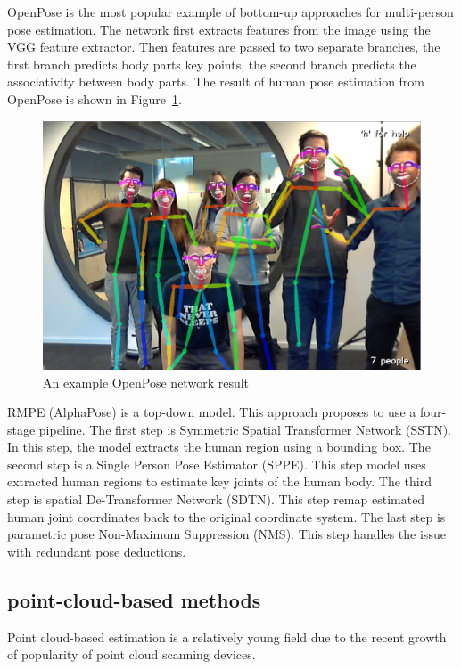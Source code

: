 OpenPose \parencite{cao_openpose_2019} is the most popular example of bottom-up approaches for multi-person pose estimation. The network first extracts features from the image using the VGG feature extractor. Then features are passed to two separate branches, the first branch predicts body parts key points, the second branch predicts the associativity between body parts. The result of human pose estimation from OpenPose is shown in Figure~\ref{img:openpose}.

\begin{figure}[htbp]
    \centerline{\includegraphics[scale=0.15]{Figures/OpenPose.png}}
    \caption{An example OpenPose network result  \parencite{cao_openpose_2019}}
    \label{img:openpose}
\end{figure}

RMPE (AlphaPose) \parencite{fang_rmpe_2018} is a top-down model.
This approach proposes to use a four-stage pipeline. The first step is Symmetric Spatial Transformer Network (SSTN). In this step, the model extracts the human region using a bounding box. The second step is a Single Person Pose Estimator (SPPE). This step model uses extracted human regions to estimate key joints of the human body. The third step is spatial De-Transformer Network (SDTN). This step remap estimated human joint coordinates back to the original coordinate system. The last step is parametric pose Non-Maximum Suppression (NMS). This step handles the issue with redundant pose deductions.

\subsection{point-cloud-based methods} 
Point cloud-based estimation is a relatively young field due to the recent growth of popularity of point cloud scanning devices.

